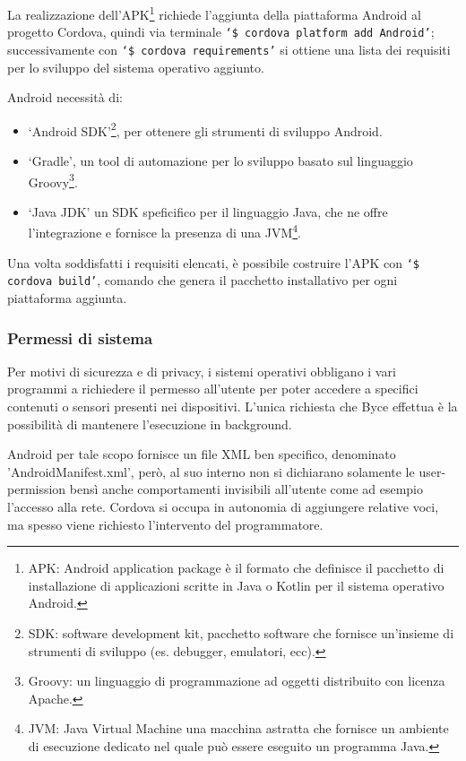 \documentclass[target=bach]{thud}
\begin{document}
        La realizzazione dell'APK\footnote[8]{APK: Android application package è il formato che definisce il pacchetto di installazione di applicazioni scritte in Java o Kotlin per il sistema operativo Android.} richiede l'aggiunta della piattaforma Android al progetto Cordova, quindi via terminale \texttt{`\$ cordova platform add Android'}; successivamente con \texttt{`\$ cordova requirements'} si ottiene una lista dei requisiti per lo sviluppo del sistema operativo aggiunto.

        Android necessità di:
        \begin{itemize}
            \setlength{\itemsep}{1pt}
            \item `Android SDK'\footnote[9]{SDK: software development kit, pacchetto software che fornisce un'insieme di strumenti di sviluppo (es. debugger, emulatori, ecc).}, per ottenere gli strumenti di sviluppo Android.
            \item `Gradle', un tool di automazione per lo sviluppo basato sul linguaggio Groovy\footnote[10]{Groovy: un linguaggio di programmazione ad oggetti distribuito con licenza Apache.}.
            \item `Java JDK' un SDK speficifico per il linguaggio Java, che ne offre l'integrazione e fornisce la presenza di una JVM\footnote[11]{JVM: Java Virtual Machine una macchina astratta che fornisce un ambiente di esecuzione dedicato nel quale può essere eseguito un programma Java.}.
        \end{itemize}

        Una volta soddisfatti i requisiti elencati, è possibile costruire l'APK con \texttt{`\$ cordova build'}, comando che genera il pacchetto installativo per ogni piattaforma aggiunta.

            \subsubsection{Permessi di sistema}

            Per motivi di sicurezza e di privacy, i sistemi operativi obbligano i vari programmi a richiedere il permesso all'utente per poter accedere a specifici contenuti o sensori presenti nei dispositivi.
            L'unica richiesta che Byce effettua è la possibilità di mantenere l'esecuzione in background.

            Android per tale scopo fornisce un file XML ben specifico, denominato 'AndroidManifest.xml', però, al suo interno non si dichiarano solamente le user-permission bensì anche comportamenti invisibili all'utente come ad esempio l'accesso alla rete.
            Cordova si occupa in autonomia di aggiungere relative voci, ma spesso viene richiesto l'intervento del programmatore.
\end{document}
